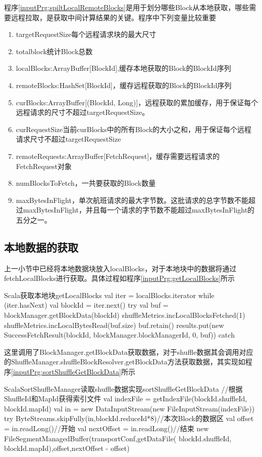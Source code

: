 程序\ref{inputPrg:spiltLocalRemoteBlocks}是用于划分哪些Block从本地获取，哪些需要远程拉取，是获取中间计算结果的关键。程序中下列变量比较重要
\begin{enumerate}[\bfseries 1]
	\item targetRequestSize每个远程请求块的最大尺寸
	\item totalblock统计Block总数
	\item localBlocks:ArrayBuffer[BlockId],缓存本地获取的Block的BlockId序列
	\item remoteBlocks:HashSet[BlockId]，缓存远程获取的Block的BlockId序列
	\item curBlocks:ArrayBuffer[(BlockId, Long)]，远程获取的累加缓存，用于保证每个远程请求的尺寸不超过targetRequestSize。
	\item  curRequestSize当前curBlocks中的所有Block的大小之和，用于保证每个远程请求尺寸不超过targetRequestSize
	\item remoteRequests:ArrayBuffer[FetchRequest]，缓存需要远程请求的FetchRequest对象
	\item numBlocksToFetch，一共要获取的Block数量
	\item maxBytesInFlight，单次航班请求的最大字节数。这批请求的总字节数不能超过maxBytesInFlight，并且每一个请求的字节数不能超过maxBytesInFlight的五分之一。
\end{enumerate}
\subsection{本地数据的获取}
上一小节中已经将本地数据块放入localBlocks，对于本地块中的数据将通过fetchLocalBlocks进行获取。具体过程如程序\ref{inputPrg:getLocalBlocks}所示
\begin{codeInput}{Scala}{获取本地块}{getLocalBlocks}
val iter = localBlocks.iterator
while (iter.hasNext) {
  val blockId = iter.next()
  try {
    val buf = blockManager.getBlockData(blockId)
    shuffleMetrics.incLocalBlocksFetched(1)
    shuffleMetrics.incLocalBytesRead(buf.size)
    buf.retain()
    results.put(new SuccessFetchResult(blockId, blockManager.blockManagerId, 0, buf))
  } catch {
  }
}
\end{codeInput}
这里调用了BlockManager.getBlockData获取数据，对于shuffle数据其会调用对应的ShuffleManager.shuffleBlockResolver.getBlockData方法获取数据，其实现如程序\ref{inputPrg:sortShuffleGetBlockData}所示
\begin{codeInput}{Scala}{SortShuffleManager读取shuffle数据实现}{sortShuffleGetBlockData}
//根据ShuffleId和MapId获得索引文件
val indexFile = getIndexFile(blockId.shuffleId, blockId.mapId)
val in = new DataInputStream(new FileInputStream(indexFile))
try {
  ByteStreams.skipFully(in,blockId.reduceId*8)//本次Block的数据区
  val offset = in.readLong()//开始
  val nextOffset = in.readLong()//结束
  new FileSegmentManagedBuffer(transportConf,getDataFile(
  blockId.shuffleId, blockId.mapId),offset,nextOffset - offset)
} 
\end{codeInput}

